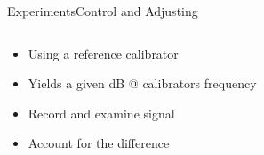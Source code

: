 \begin{frame}{Experiments}{Control and Adjusting}		
	\begin{columns}
		\begin{column}{0.3\textwidth}
			\begin{itemize}
				\item Using a reference calibrator
				\item Yields a given dB @ calibrators frequency
				\item Record and examine signal
				\item Account for the difference 
			\end{itemize}	
		\end{column}	
		\begin{column}{0.7\textwidth} 
			\begin{figure}
			\end{figure}
		\end{column}
	\end{columns}
\end{frame}

